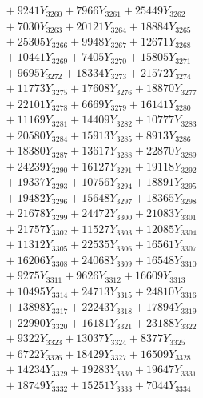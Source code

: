 \documentclass[a4paper,10pt]{article}
\begin{document}
{\begin{align}
&\;  + 9241 Y_{3260} + 7966 Y_{3261} + 25449 Y_{3262} \\[0.3ex]
&\;  + 7030 Y_{3263} + 20121 Y_{3264} + 18884 Y_{3265} \\[0.3ex]
&\;  + 25305 Y_{3266} + 9948 Y_{3267} + 12671 Y_{3268} \\[0.5ex]\allowbreak
&\;  + 10441 Y_{3269} + 7405 Y_{3270} + 15805 Y_{3271} \\[0.3ex]
&\;  + 9695 Y_{3272} + 18334 Y_{3273} + 21572 Y_{3274} \\[0.3ex]
&\;  + 11773 Y_{3275} + 17608 Y_{3276} + 18870 Y_{3277} \\[0.3ex]
&\;  + 22101 Y_{3278} + 6669 Y_{3279} + 16141 Y_{3280} \\[0.3ex]
&\;  + 11169 Y_{3281} + 14409 Y_{3282} + 10777 Y_{3283} \\[0.3ex]
&\;  + 20580 Y_{3284} + 15913 Y_{3285} + 8913 Y_{3286} \\[0.3ex]
&\;  + 18380 Y_{3287} + 13617 Y_{3288} + 22870 Y_{3289} \\[0.3ex]
&\;  + 24239 Y_{3290} + 16127 Y_{3291} + 19118 Y_{3292} \\[0.3ex]
&\;  + 19337 Y_{3293} + 10756 Y_{3294} + 18891 Y_{3295} \\[0.3ex]
&\;  + 19482 Y_{3296} + 15648 Y_{3297} + 18365 Y_{3298} \\[0.5ex]\allowbreak
&\;  + 21678 Y_{3299} + 24472 Y_{3300} + 21083 Y_{3301} \\[0.3ex]
&\;  + 21757 Y_{3302} + 11527 Y_{3303} + 12085 Y_{3304} \\[0.3ex]
&\;  + 11312 Y_{3305} + 22535 Y_{3306} + 16561 Y_{3307} \\[0.3ex]
&\;  + 16206 Y_{3308} + 24068 Y_{3309} + 16548 Y_{3310} \\[0.3ex]
&\;  + 9275 Y_{3311} + 9626 Y_{3312} + 16609 Y_{3313} \\[0.3ex]
&\;  + 10495 Y_{3314} + 24713 Y_{3315} + 24810 Y_{3316} \\[0.3ex]
&\;  + 13898 Y_{3317} + 22243 Y_{3318} + 17894 Y_{3319} \\[0.3ex]
&\;  + 22990 Y_{3320} + 16181 Y_{3321} + 23188 Y_{3322} \\[0.3ex]
&\;  + 9322 Y_{3323} + 13037 Y_{3324} + 8377 Y_{3325} \\[0.3ex]
&\;  + 6722 Y_{3326} + 18429 Y_{3327} + 16509 Y_{3328} \\[0.5ex]\allowbreak
&\;  + 14234 Y_{3329} + 19283 Y_{3330} + 19647 Y_{3331} \\[0.3ex]
&\;  + 18749 Y_{3332} + 15251 Y_{3333} + 7044 Y_{3334} \\[0.3ex]

\end{align}}
\end{document}
